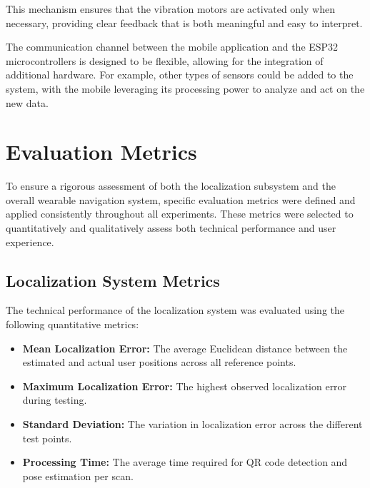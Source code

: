 This mechanism ensures that the vibration motors are activated only when necessary, providing clear feedback that is both meaningful and easy to interpret.

The communication channel between the mobile application and the ESP32 microcontrollers is designed to be flexible, allowing for the integration of additional hardware. For example, other types of sensors could be added to the system, with the mobile leveraging its processing power to analyze and act on the new data.

\section{Evaluation Metrics}
\label{sec:evaluation_metrics}

To ensure a rigorous assessment of both the localization subsystem and the overall wearable navigation system, specific evaluation metrics were defined and applied consistently throughout all experiments. These metrics were selected to quantitatively and qualitatively assess both technical performance and user experience.

\subsection{Localization System Metrics}
The technical performance of the localization system was evaluated using the following quantitative metrics:
\begin{itemize}
	\item \textbf{Mean Localization Error:} The average Euclidean distance between the estimated and actual user positions across all reference points.
	\item \textbf{Maximum Localization Error:} The highest observed localization error during testing.
	\item \textbf{Standard Deviation:} The variation in localization error across the different test points.
	\item \textbf{Processing Time:} The average time required for QR code detection and pose estimation per scan.
\end{itemize}

